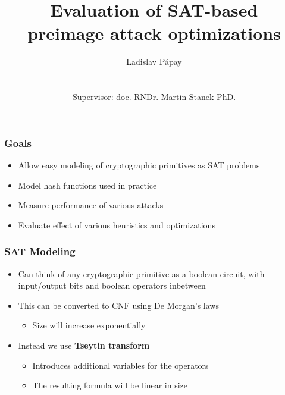 \documentclass{beamer}
\title[SAT-based preimage attack optimizations]{Evaluation of SAT-based\\ preimage attack optimizations}
\author[Ladislav Pápay]{Ladislav Pápay\\~\\~\\ Supervisor: doc. RNDr. Martin Stanek PhD.}
\date{}
\begin{document}
\frame{\titlepage}

%
%


\begin{frame}
\frametitle{Goals}
\begin{itemize}
\item Allow easy modeling of cryptographic primitives as SAT problems
\item Model hash functions used in practice
\item Measure performance of various attacks
\item Evaluate effect of various heuristics and optimizations
\end{itemize}
\end{frame}

\begin{frame}
\frametitle{SAT Modeling}
\begin{itemize}
\item Can think of any cryptographic primitive as a boolean circuit, with input/output bits and boolean operators inbetween
\item This can be converted to CNF using De Morgan's laws
\begin{itemize}
	\item Size will increase exponentially
\end{itemize}
\item Instead we use \textbf{Tseytin transform}
\begin{itemize}
	\item Introduces additional variables for the operators
	\item The resulting formula will be linear in size
\end{itemize}
\end{itemize}
\end{frame}
\end{document}
